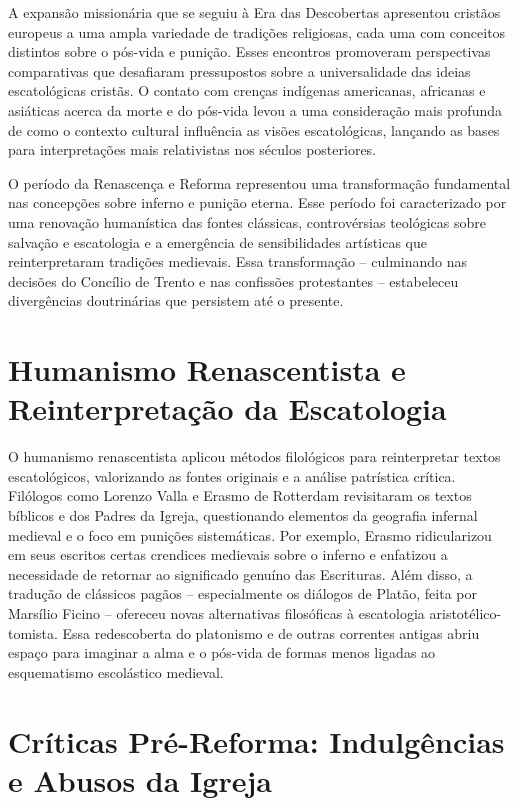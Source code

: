A expansão missionária que se seguiu à Era das Descobertas apresentou cristãos europeus a uma ampla variedade de tradições religiosas, cada uma com conceitos distintos sobre o pós-vida e punição. Esses encontros promoveram perspectivas comparativas que desafiaram pressupostos sobre a universalidade das ideias escatológicas cristãs. O contato com crenças indígenas americanas, africanas e asiáticas acerca da morte e do pós-vida levou a uma consideração mais profunda de como o contexto cultural influência as visões escatológicas, lançando as bases para interpretações mais relativistas nos séculos posteriores.

O período da Renascença e Reforma representou uma transformação fundamental nas concepções sobre inferno e punição eterna. Esse período foi caracterizado por uma renovação humanística das fontes clássicas, controvérsias teológicas sobre salvação e escatologia e a emergência de sensibilidades artísticas que reinterpretaram tradições medievais. Essa transformação -- culminando nas decisões do Concílio de Trento e nas confissões protestantes -- estabeleceu divergências doutrinárias que persistem até o presente.

\section{Humanismo Renascentista e Reinterpretação da Escatologia}

O humanismo renascentista aplicou métodos filológicos para reinterpretar textos escatológicos, valorizando as fontes originais e a análise patrística crítica. Filólogos como Lorenzo Valla e Erasmo de Rotterdam revisitaram os textos bíblicos e dos Padres da Igreja, questionando elementos da geografia infernal medieval e o foco em punições sistemáticas. Por exemplo, Erasmo ridicularizou em seus escritos certas crendices medievais sobre o inferno e enfatizou a necessidade de retornar ao significado genuíno das Escrituras. Além disso, a tradução de clássicos pagãos -- especialmente os diálogos de Platão, feita por Marsílio Ficino -- ofereceu novas alternativas filosóficas à escatologia aristotélico-tomista. Essa redescoberta do platonismo e de outras correntes antigas abriu espaço para imaginar a alma e o pós-vida de formas menos ligadas ao esquematismo escolástico medieval.


\section{Críticas Pré-Reforma: Indulgências e Abusos da Igreja}

